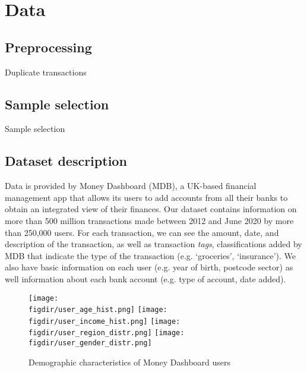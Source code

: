
\section{Data}%
\label{sec:data}

\subsection{Preprocessing}%
\label{sub:preprocessing}

Duplicate transactions


\subsection{Sample selection}%
\label{sub:sample_selection}

\begin{table}[ht]
\caption{Sample selection}\label{tab:selection}

\end{table}


\subsection{Dataset description}
\label{sub:dataset_description}
Data is provided by Money Dashboard (MDB), a UK-based
financial management app that allows its users to add accounts from all
their banks to obtain an integrated view of their finances. Our
dataset contains information on more than 500 million transactions made between
2012 and June 2020 by more than 250,000 users. For each transaction, we can see
the amount, date, and description of the transaction, as well as transaction
\textit{tags}, classifications added by MDB that indicate the type of the
transaction (e.g.  `groceries', `insurance'). We also have basic information
 on each user (e.g. year of birth, postcode sector) as well information about
each bank account (e.g. type of account, date added).

\begin{figure}
    \caption{Demographic characteristics of Money Dashboard users}
    \label{fig:sumstats}
    \texttt{[image: \\figdir/user\_age\_hist.png]}
    \texttt{[image: \\figdir/user\_income\_hist.png]}
    \texttt{[image: \\figdir/user\_region\_distr.png]}
    \texttt{[image: \\figdir/user\_gender\_distr.png]}
\end{figure}

